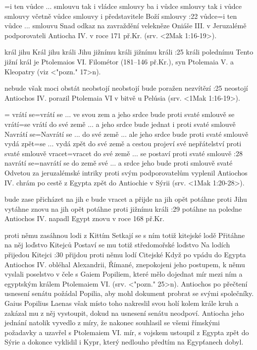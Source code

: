 ={i ten vůdce ...  smlouvu}   %
    {tak i vládce smlouvy}   %
    {ba i vůdce smlouvy}   %
    {tak i vůdce smlouvy}   %
    {včetně vůdce smlouvy}   %
    {i představitele Boží smlouvy}   %
:22 {vůdce}={i ten vůdce ... smlouvu} %
        Snad odkaz na zavraždění velekněze Oniáše III. v Jeruzalémě podporovateli Antiocha IV. v roce 171 př.Kr. (srv. <2Mak 1:16-19>).
        
    {král jihu}   %
    {Král jihu}   %
    {králi Jihu}   %
    {jižnímu králi}   %
    {jižnímu králi}   %
:25 {králi polednímu}
    Tento jižní král je Ptolemaios VI. Filométor (181--146 př.Kr.),  syn Ptolemaia V. a Kleopatry (viz <"pozn." 17>n).

    {nebude však moci obstát}   %
    {neobstojí}   %
    {neobstojí}   %
    {bude poražen}   %
    {nezvítězí}  %
:25 {neostojí}
    Antiochos IV. porazil Ptolemaia VI v bitvě u Pelúsia (srv. <1Mak 1:16-19>).

={}   %
    {vrátí se}={vrátí se ... ve svou zem a jeho srdce bude proti svaté smlouvě}   %
    {se vrátí}={se vrátí do své země ... a jeho srdce bude jednat i proti svaté smlouvě}   %
    {Navrátí se}={Navrátí se ... do své země ... ale jeho srdce bude proti svaté smlouvě}   %
    {vydá zpět}={se ... vydá zpět do své země a cestou projeví své nepřátelství proti svaté smlouvě}   %
    {vracet}={vracet do své země ... se postaví proti svaté smlouvě}   %
:28 {navrátí se}={navrátí se do země své ... a srdce jeho bude proti smlouvě svaté}
    Odvetou za jeruzalémské intriky proti svým podporovatelům vyplenil Antiochos IV. chrám po cestě z Egypta zpět do  Antiochie v Sýrii (srv. <1Mak 1:20-28>). 

    {bude zase přicházet na jih}   %
    {e bude vracet a přijde na jih}   %
    {opět potáhne proti Jihu}   %
    {vytáhne znovu na jih}  %
    {opět potáhne proti jižnímu králi}   %
:29 {potáhne na poledne}
    Antiochos IV. napadl Egypt znovu v roce 168 př.Kr.
    
    {proti němu zasáhnou lodi z Kittím}   %
    {Setkají se s ním totiž kitejské lodě}  %
    {Přitáhne na něj loďstvo Kitejců}   %
    {Postaví se mu totiž středomořské loďstvo}   %
    {Na lodích přijedou Kitejci}   %
:30 {přijdou proti němu lodí Citejské}
    Když po vpádu do Egypta Antiochos IV. obléhal Alexandrii,   Římané, znepokojeni jeho postupem, k němu vyslali poselstvo v čele s Gaiem Popiliem, které mělo dojednat mír mezi ním a egyptským králem Ptolemaiem VI. (srv. <"pozn." 25>n). Antiochos po přečtení usnesení senátu požádal Popilia, aby mohl dokument probrat se svými společníky. Gaius Popilius Laenas však místo toho nakreslil svou holí kolem krále kruh a zakázal mu z něj vystoupit, dokud na usnesení senátu neodpoví. Antiocha jeho jednání natolik vyvedlo z míry, že nakonec souhlasil se všemi římskými požadavky a uzavřel s Ptolemaiem VI. mír, s vojskem ustoupil z Egypta zpět do Sýrie a dokonce vyklidil i Kypr, který nedlouho předtím na Egypťanech dobyl.
    
